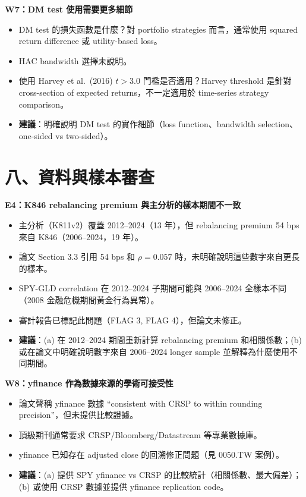 \documentclass[12pt,a4paper]{article}
\begin{document}
\textcolor{warncolor}{\textbf{W7：DM test 使用需要更多細節}}

\begin{itemize}[leftmargin=2em]
\item DM test 的損失函數是什麼？對 portfolio strategies 而言，通常使用 squared return difference 或 utility-based loss。
\item HAC bandwidth 選擇未說明。
\item 使用 Harvey et al.\ (2016) $t > 3.0$ 門檻是否適用？Harvey threshold 是針對 cross-section of expected returns，不一定適用於 time-series strategy comparison。
\item \textbf{建議}：明確說明 DM test 的實作細節（loss function、bandwidth selection、one-sided vs two-sided）。
\end{itemize}

\section*{八、資料與樣本審查}

\textcolor{errorred}{\textbf{E4：K846 rebalancing premium 與主分析的樣本期間不一致}}

\begin{itemize}[leftmargin=2em]
\item 主分析（K811v2）覆蓋 2012--2024（13 年），但 rebalancing premium 54 bps 來自 K846（2006--2024，19 年）。
\item 論文 Section 3.3 引用 54 bps 和 $\rho = 0.057$ 時，未明確說明這些數字來自更長的樣本。
\item SPY-GLD correlation 在 2012--2024 子期間可能與 2006--2024 全樣本不同（2008 金融危機期間黃金行為異常）。
\item 審計報告已標記此問題（FLAG 3, FLAG 4），但論文未修正。
\item \textbf{建議}：(a) 在 2012--2024 期間重新計算 rebalancing premium 和相關係數；(b) 或在論文中明確說明數字來自 2006--2024 longer sample 並解釋為什麼使用不同期間。
\end{itemize}

\textcolor{warncolor}{\textbf{W8：yfinance 作為數據來源的學術可接受性}}

\begin{itemize}[leftmargin=2em]
\item 論文聲稱 yfinance 數據 ``consistent with CRSP to within rounding precision''，但未提供比較證據。
\item 頂級期刊通常要求 CRSP/Bloomberg/Datastream 等專業數據庫。
\item yfinance 已知存在 adjusted close 的回溯修正問題（見 0050.TW 案例）。
\item \textbf{建議}：(a) 提供 SPY yfinance vs CRSP 的比較統計（相關係數、最大偏差）；(b) 或使用 CRSP 數據並提供 yfinance replication code。
\end{itemize}
\end{document}

